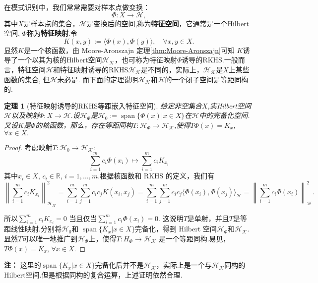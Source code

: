 \documentclass[12pt, a4paper, oneside]{ctexbook}
\newtheorem{theorem}{定理}[section]
\begin{document}
在模式识别中，我们常常需要对样本点做变换：
\begin{equation}\label{def:特征映射}
    \Phi:X\to \mathcal{H},
\end{equation}
其中$X$是样本点的集合，$\mathcal{H}$是变换后的空间,称为\textbf{特征空间}，它通常是一个Hilbert空间, $\Phi$称为\textbf{特征映射}.令
\begin{equation*}
    K(x,y):=\langle \Phi(x),\Phi(y)\rangle,\quad\forall x,y\in X.
\end{equation*}
显然$K$是一个核函数，由 Moore-Aronszajn 定理\ref{thm:Moore-Aronszajn}可知 $K$诱导了一个以其为核的Hilbert空间$\mathcal{H_K}$，也可称为特征映射$\Phi$诱导的RKHS.一般而言，特征空间$\mathcal{H}$和特征映射诱导的RKHS$\mathcal{H_K}$是不同的，实际上，$\mathcal{H_K}$是$X$上某些函数的集合, 但$\mathcal{H}$未必是. 而下面的定理说明$\mathcal{H_K}$和$\mathcal{H}$的一个闭子空间是等距同构的.

\begin{theorem}[特征映射诱导的RKHS等距嵌入特征空间]
    给定非空集合$X$,实Hilbert空间$\mathcal{H}$以及映射$\Phi:X\to \mathcal{H}.$设$\mathcal{H}_{\Phi}$是$\mathcal{H}_{0}:=\operatorname{span}\{\Phi(x)|x\in X\}$在$\mathcal{H}$中的完备化空间.又设$K$是$\Phi$的核函数，那么，存在等距同构$T:\mathcal{H}_\Phi\to\mathcal{H_K}$,使得$T\Phi ( x) = K_x$, $\forall x\in X.$
\end{theorem}

\begin{proof}
    考虑映射$T:\mathcal{H}_0\to\mathcal{H_K}$:
    \begin{equation*}
        \sum_{i=1}^m c_i\Phi(x_i)\mapsto\sum_{i=1}^mc_iK_{x_i}
    \end{equation*}
    其中$x_i\in X$, $c_i\in \mathbb{R}$, $i= 1, \dots , m.$根据核函数和 RKHS 的定义，我们有
$$\left\|\sum_{i=1}^{m}c_{i}K_{x_{i}}\right\|_{\mathcal{H_K}}^{2}=\sum_{i=1}^{m}\sum_{j=1}^{m}c_{i}c_{j}K(x_{i},x_{j})=\sum_{i=1}^{m}\sum_{j=1}^{m}c_{i}c_{j}\langle\Phi(x_{i}),\Phi(x_{j})\rangle_{\mathcal{H}}=\left\|\sum_{i=1}^{m}c_{i}\Phi(x_{i})\right\|_{\mathcal{H}}^{2}.$$

所以$\sum_{i=1}^{m}c_{i}K_{x_{i}}=0$ 当且仅当$\sum_{i=1}^{m}c_{i}\Phi(x_{i})=0.$ 这说明$T$是单射，并且$T$是等距线性映射.分别将$\mathcal{H}_0$和 $\operatorname{span}\{K_x|x\in X\}$完备化，得到 Hilbert 空间$\mathcal{H}_\Phi$和$\mathcal{H_K}.$显然$T$可以唯一地推广到$\mathcal{H}_\Phi$上，使得$T:H_\Phi\to\mathcal{H_K}$ 是一个等距同构.易见，$T\Phi ( x) = K_x$, $\forall x\in X.$

\end{proof}
\textbf{注：} 这里的$\operatorname{span}\{K_x|x\in X\}$完备化后并不是$\mathcal{H_K}$，实际上是一个与$\mathcal{H_K}$同构的Hilbert空间.但是根据同构的复合运算，上述证明依然合理.
\end{document}
